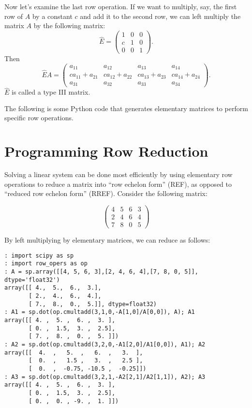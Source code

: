 Now let's examine the last row operation.
If we want to multiply, say, the first row of $A$ by a constant $c$ and add it to the second row, we can left multiply the matrix $A$ by the following matrix:
\[
\widehat{E} = \begin{pmatrix}
1&0&0\\
c&1&0\\
0&0&1
\end{pmatrix}.
\]
Then
\[
\widehat{E} A =
\begin{pmatrix}
a_{11}&a_{12}&a_{13}&a_{14}\\
c a_{11} + a_{21}&c a_{12} + a_{22}&c a_{13} + a_{23}&c a_{14} + a_{24}\\
a_{31}&a_{32}&a_{33}&a_{34}
\end{pmatrix}.
\]
$\widehat{E}$ is called a type III matrix.

The following is some Python code that generates elementary matrices to perform specific row operations.


\section*{Programming Row Reduction}

Solving a linear system can be done most efficiently by using elementary row operations to reduce a matrix into ``row echelon form'' (REF), as opposed to ``reduced row echelon form'' (RREF).
Consider the following matrix: 

\[
\begin{pmatrix}
4&5&6&3 \\
2&4&6&4 \\
7&8&0&5
\end{pmatrix}
\]

By left multiplying by elementary matrices, we can reduce as follows:
\begin{lstlisting}
: import scipy as sp
: import row_opers as op
: A = sp.array([[4, 5, 6, 3],[2, 4, 6, 4],[7, 8, 0, 5]], dtype='float32')
array([[ 4.,  5.,  6.,  3.],
       [ 2.,  4.,  6.,  4.],
       [ 7.,  8.,  0.,  5.]], dtype=float32)
: A1 = sp.dot(op.cmultadd(3,1,0,-A[1,0]/A[0,0]), A); A1
array([[ 4. ,  5. ,  6. ,  3. ],
       [ 0. ,  1.5,  3. ,  2.5],
       [ 7. ,  8. ,  0. ,  5. ]])
: A2 = sp.dot(op.cmultadd(3,2,0,-A1[2,0]/A1[0,0]), A1); A2
array([[  4.  ,   5.  ,   6.  ,   3.  ],
       [  0.  ,   1.5 ,   3.  ,   2.5 ],
       [  0.  ,  -0.75, -10.5 ,  -0.25]])
: A3 = sp.dot(op.cmultadd(3,2,1,-A2[2,1]/A2[1,1]), A2); A3
array([[ 4. ,  5. ,  6. ,  3. ],
       [ 0. ,  1.5,  3. ,  2.5],
       [ 0. ,  0. , -9. ,  1. ]])
\end{lstlisting}


